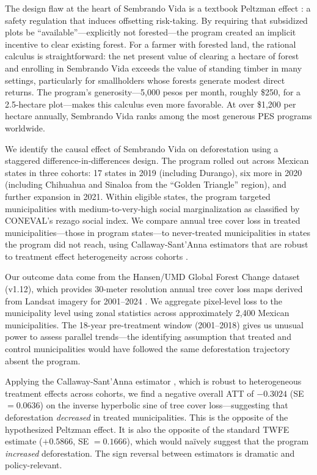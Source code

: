 \documentclass[12pt]{article}
\begin{document}
The design flaw at the heart of Sembrando Vida is a textbook Peltzman effect \citep{peltzman1975effects}: a safety regulation that induces offsetting risk-taking. By requiring that subsidized plots be ``available''---explicitly not forested---the program created an implicit incentive to clear existing forest. For a farmer with forested land, the rational calculus is straightforward: the net present value of clearing a hectare of forest and enrolling in Sembrando Vida exceeds the value of standing timber in many settings, particularly for smallholders whose forests generate modest direct returns. The program's generosity---5,000 pesos per month, roughly \$250, for a 2.5-hectare plot---makes this calculus even more favorable. At over \$1,200 per hectare annually, Sembrando Vida ranks among the most generous PES programs worldwide.

We identify the causal effect of Sembrando Vida on deforestation using a staggered difference-in-differences design. The program rolled out across Mexican states in three cohorts: 17 states in 2019 (including Durango), six more in 2020 (including Chihuahua and Sinaloa from the ``Golden Triangle'' region), and further expansion in 2021. Within eligible states, the program targeted municipalities with medium-to-very-high social marginalization as classified by CONEVAL's rezago social index. We compare annual tree cover loss in treated municipalities---those in program states---to never-treated municipalities in states the program did not reach, using Callaway-Sant'Anna estimators that are robust to treatment effect heterogeneity across cohorts \citep{callaway2021difference}.

Our outcome data come from the Hansen/UMD Global Forest Change dataset (v1.12), which provides 30-meter resolution annual tree cover loss maps derived from Landsat imagery for 2001--2024 \citep{hansen2013high}. We aggregate pixel-level loss to the municipality level using zonal statistics across approximately 2,400 Mexican municipalities. The 18-year pre-treatment window (2001--2018) gives us unusual power to assess parallel trends---the identifying assumption that treated and control municipalities would have followed the same deforestation trajectory absent the program.

Applying the Callaway-Sant'Anna estimator \citep{callaway2021difference}, which is robust to heterogeneous treatment effects across cohorts, we find a negative overall ATT of $-0.3024$ (SE $= 0.0636$) on the inverse hyperbolic sine of tree cover loss---suggesting that deforestation \textit{decreased} in treated municipalities. This is the opposite of the hypothesized Peltzman effect. It is also the opposite of the standard TWFE estimate ($+0.5866$, SE $= 0.1666$), which would na\"{i}vely suggest that the program \textit{increased} deforestation. The sign reversal between estimators is dramatic and policy-relevant.
\end{document}
